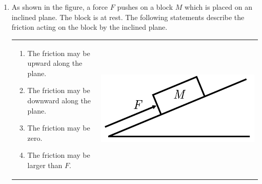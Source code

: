 \documentclass[12pt,letterpaper]{article}
\begin{document}
\begin{enumerate}
\item
As shown in the figure, a force $F$ pushes on a block $M$ which is placed on an inclined plane. The block is at rest. The following statements describe the friction acting on the block by the inclined plane.

\begin{tabular}{l r}

\begin{minipage}{0.6\textwidth}
\begin{enumerate}[label=\Roman*.]
\item The friction may be upward along the plane.
\item The friction may be downward along the plane.
\item The friction may be zero.
\item The friction may be larger than $F$.
\end{enumerate}
\end{minipage} &
\begin{minipage}{0.3\textwidth}
\includegraphics[width=\textwidth]{incline.png}
\end{minipage}
\end{tabular}



\end{enumerate}
\end{document}
